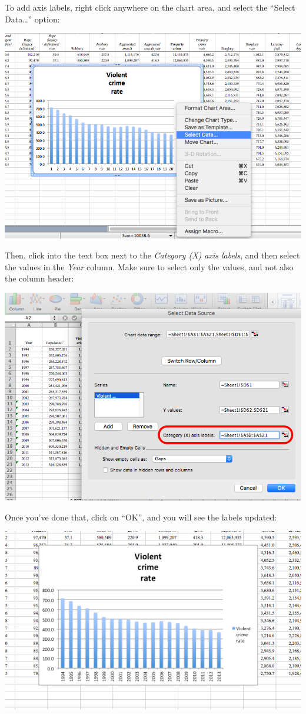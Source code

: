\documentclass[]{book}
\theoremstyle{definition}
\theoremstyle{definition}
\theoremstyle{definition}
\theoremstyle{remark}
\begin{document}
To add axis labels, right click anywhere on the chart area, and select
the ``Select Data\ldots{}'' option:

\includegraphics{imgs/desc_viz_3.png}

Then, click into the text box next to the \emph{Category (X) axis
labels}, and then select the values in the \emph{Year} column. Make sure
to select only the values, and not also the column header:

\includegraphics{imgs/desc_viz_4.png}

Once you've done that, click on ``OK'', and you will see the labels
updated:

\includegraphics{imgs/desc_viz_5.png}
\end{document}
